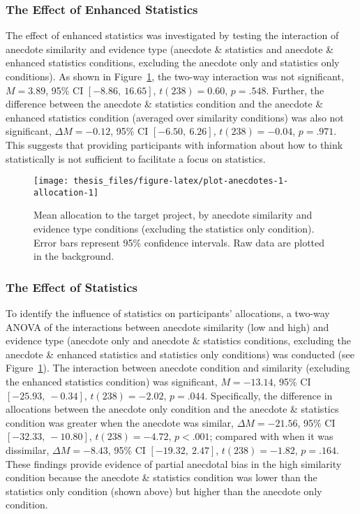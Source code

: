 \documentclass[a4paper, nobind]{templates/ociamthesis}
\theoremstyle{definition}
\theoremstyle{definition}
\theoremstyle{definition}
\theoremstyle{definition}
\theoremstyle{remark}
\begin{document}
\subsubsection{The Effect of Enhanced Statistics}

The effect of enhanced statistics was investigated by testing the interaction of
anecdote similarity and evidence type (anecdote \& statistics and anecdote \&
enhanced statistics conditions, excluding the anecdote only and statistics only
conditions). As shown in
Figure~\ref{fig:plot-anecdotes-1-allocation}, the two-way interaction was not
significant,
\(M = 3.89\), 95\% CI \([-8.86,~16.65]\), \(t(238) = 0.60\), \(p = .548\).
Further, the difference between the anecdote \& statistics condition and the
anecdote \& enhanced statistics condition (averaged over similarity conditions)
was also not significant, \(\Delta M = -0.12\), 95\% CI \([-6.50,~6.26]\), \(t(238) = -0.04\), \(p = .971\).
This suggests that providing participants with information about how to think
statistically is not sufficient to facilitate a focus on statistics.



\begin{figure}
\texttt{[image: thesis\_files/figure-latex/plot-anecdotes-1-allocation-1]} \caption{Mean allocation to the target project, by anecdote similarity and evidence type conditions (excluding the statistics only condition). Error bars represent 95\% confidence intervals. Raw data are plotted in the background.}\label{fig:plot-anecdotes-1-allocation}
\end{figure}

\subsubsection{The Effect of Statistics}

To identify the influence of statistics on participants' allocations, a two-way
ANOVA of the interactions between anecdote similarity (low and high) and
evidence type (anecdote only and anecdote \& statistics conditions, excluding the
anecdote \& enhanced statistics and statistics only conditions) was conducted
(see Figure~\ref{fig:plot-anecdotes-1-allocation}). The interaction between
anecdote condition and similarity (excluding the enhanced statistics condition)
was significant, \(M = -13.14\), 95\% CI \([-25.93,~-0.34]\), \(t(238) = -2.02\), \(p = .044\).
Specifically, the difference in allocations between the anecdote only condition
and the anecdote \& statistics condition was greater when the anecdote was
similar, \(\Delta M = -21.56\), 95\% CI \([-32.33,~-10.80]\), \(t(238) = -4.72\), \(p < .001\); compared
with when it was dissimilar,
\(\Delta M = -8.43\), 95\% CI \([-19.32,~2.47]\), \(t(238) = -1.82\), \(p = .164\). These findings provide
evidence of partial anecdotal bias in the high similarity condition because the
anecdote \& statistics condition was lower than the statistics only condition
(shown above) but higher than the anecdote only condition.
\end{document}
